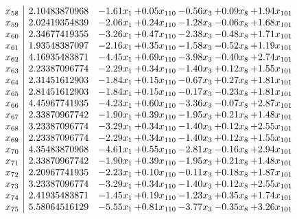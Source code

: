 \documentclass[8pt]{article}
\begin{document}
\[\begin{array}{c| c c@{\hskip 2pt} c@{\hskip 2pt} c@{\hskip 2pt} c@{\hskip 2pt} c@{\hskip 2pt} }
 x_{58}   &  2.10483870968 & -1.61 x_{1} & +  0.05 x_{110} & -0.56 x_{3} & +  0.09 x_{8} & +  1.94 x_{101}\\
 x_{59}   &  2.02419354839 & -2.06 x_{1} & +  0.24 x_{110} & -1.28 x_{3} & -0.06 x_{8} & +  1.68 x_{101}\\
 x_{60}   &  2.34677419355 & -3.26 x_{1} & +  0.47 x_{110} & -2.38 x_{3} & -0.48 x_{8} & +  1.71 x_{101}\\
 x_{61}   &  1.93548387097 & -2.16 x_{1} & +  0.35 x_{110} & -1.58 x_{3} & -0.52 x_{8} & +  1.19 x_{101}\\
 x_{62}   &  4.16935483871 & -4.45 x_{1} & +  0.69 x_{110} & -3.98 x_{3} & -0.40 x_{8} & +  2.74 x_{101}\\
 x_{63}   &  2.23387096774 & -2.29 x_{1} & +  0.34 x_{110} & -1.40 x_{3} & +  0.12 x_{8} & +  1.55 x_{101}\\
 x_{64}   &  2.31451612903 & -1.84 x_{1} & +  0.15 x_{110} & -0.67 x_{3} & +  0.27 x_{8} & +  1.81 x_{101}\\
 x_{65}   &  2.81451612903 & -1.84 x_{1} & +  0.15 x_{110} & -0.17 x_{3} & -0.23 x_{8} & +  1.81 x_{101}\\
 x_{66}   &  4.45967741935 & -4.23 x_{1} & +  0.60 x_{110} & -3.36 x_{3} & -0.07 x_{8} & +  2.87 x_{101}\\
 x_{67}   &  2.33870967742 & -1.90 x_{1} & +  0.39 x_{110} & -1.95 x_{3} & +  0.21 x_{8} & +  1.48 x_{101}\\
 x_{68}   &  3.23387096774 & -3.29 x_{1} & +  0.34 x_{110} & -1.40 x_{3} & +  0.12 x_{8} & +  2.55 x_{101}\\
 x_{69}   &  2.23387096774 & -2.29 x_{1} & +  0.34 x_{110} & -1.40 x_{3} & +  0.12 x_{8} & +  1.55 x_{101}\\
 x_{70}   &  4.35483870968 & -4.61 x_{1} & +  0.55 x_{110} & -2.81 x_{3} & -0.16 x_{8} & +  2.94 x_{101}\\
 x_{71}   &  2.33870967742 & -1.90 x_{1} & +  0.39 x_{110} & -1.95 x_{3} & +  0.21 x_{8} & +  1.48 x_{101}\\
 x_{72}   &  2.20967741935 & -2.23 x_{1} & +  0.10 x_{110} & -0.11 x_{3} & +  0.18 x_{8} & +  1.87 x_{101}\\
 x_{73}   &  3.23387096774 & -3.29 x_{1} & +  0.34 x_{110} & -1.40 x_{3} & +  0.12 x_{8} & +  2.55 x_{101}\\
 x_{74}   &  2.41935483871 & -1.45 x_{1} & +  0.19 x_{110} & -1.23 x_{3} & +  0.35 x_{8} & +  1.74 x_{101}\\
 x_{75}   &  5.58064516129 & -5.55 x_{1} & +  0.81 x_{110} & -3.77 x_{3} & -0.35 x_{8} & +  3.26 x_{101}\\

\end{array}\]
\end{document}
